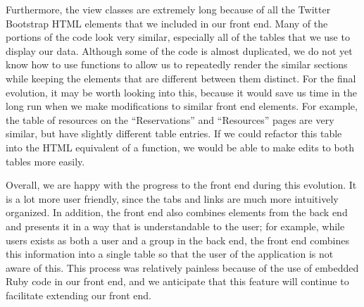 \documentclass{article}
\begin{document}
Furthermore, the view classes are extremely long because of all the Twitter Bootstrap HTML elements that we included in our front end.  Many of the portions of the code look very similar, especially all of the tables that we use to display our data.  Although some of the code is almost duplicated, we do not yet know how to use functions to allow us to repeatedly render the similar sections while keeping the elements that are different between them distinct.  For the final evolution, it may be worth looking into this, because it would save us time in the long run when we make modifications to similar front end elements.  For example, the table of resources on the ``Reservations'' and ``Resources'' pages are very similar, but have slightly different table entries.  If we could refactor this table into the HTML equivalent of a function, we would be able to make edits to both tables more easily.\par

Overall, we are happy with the progress to the front end during this evolution.  It is a lot more user friendly, since the tabs and links are much more intuitively organized.  In addition, the front end also combines elements from the back end and presents it in a way that is understandable to the user; for example, while users exists as both a user and a group in the back end, the front end combines this information into a single table so that the user of the application is not aware of this.  This process was relatively painless because of the use of embedded Ruby code in our front end, and we anticipate that this feature will continue to facilitate extending our front end.
\end{document}
